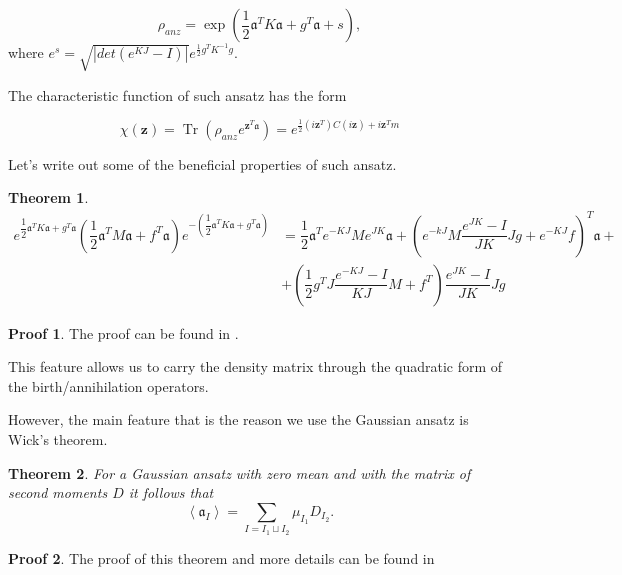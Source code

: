 \documentclass[12pt]{article}
\newtheorem{theorem}{Theorem}
\theoremstyle{definition}
\newtheorem*{demo}{Proof}
\newcommand\Tr{\operatorname{Tr}}
\newcommand\bra{\left<}
\newcommand\ket{\right>}
\newcommand{\braket}[1]{\bra#1\ket}
\newcommand{\mf}[1]{\mathfrak{#1}}
\begin{document}
	\begin{equation}
		\label{eq:ProjForAv}
		\rho_{anz}=\exp(\dfrac{1}{2}\mathfrak{a}^TK\mathfrak{a} + g^T\mathfrak{a} + s),
	\end{equation}
	where $e^s = \sqrt{|det(e^{KJ} - I)|}e^{\frac{1}{2}g^TK^{-1}g}$.
	
	The characteristic function of such ansatz has the form
	
	\begin{equation}
		\chi(\textbf{z}) = \Tr(\rho_{anz} e^{\textbf{z}^T\mathfrak{a}}) =  e^{\frac{1}{2}(i\textbf{z}^T)C(i\textbf{z}) + i\textbf{z}^Tm}
	\end{equation}
	
	Let's write out some of the beneficial properties of such ansatz.
	
	\begin{theorem}
		\label{th:KvFor}
		\begin{align*}
			\label{eq:KvFor}
			e^{\dfrac{1}{2}\mf{a}^TK\mf{a} + g^T\mf{a}}(\dfrac{1}{2}\mf{a}^TM\mf{a} + f^T\mf{a})e^{-(\dfrac{1}{2}\mf{a}^TK\mf{a} + g^T\mf{a})} &= \dfrac{1}{2}\mf{a}^Te^{-KJ}Me^{JK}\mf{a} + \left(e^{-kJ}M\dfrac{e^{JK}-I}{JK}Jg + e^{-KJ}f\right)^T\mf{a} + \nonumber\\
			&+ \left(\dfrac{1}{2}g^TJ\dfrac{e^{-KJ}-I}{KJ}M + f^T\right)\dfrac{e^{JK} - I}{JK}Jg&
		\end{align*}
	\end{theorem}
	\begin{demo}
		The proof can be found in \cite{Dis}. 
	\end{demo}
	
	This feature allows us to carry the density matrix through the quadratic form of the birth/annihilation operators.
	
	However, the main feature that is the reason we use the Gaussian ansatz is Wick's theorem.
	
	\begin{theorem}
		\label{th:IW0}
		For a Gaussian ansatz with zero mean and with the matrix of second moments $D$ it follows that 
		\begin{equation*}
			\braket{\mf{a}_I} = \sum\limits_{I = I_1 \sqcup I_2}\mu_{I_1}D_{I_2}.
		\end{equation*}
	\end{theorem}
	\begin{demo}
		The proof of this theorem and more details can be found in \cite{NosalTeretenkov}
	\end{demo}
	
\end{document}

